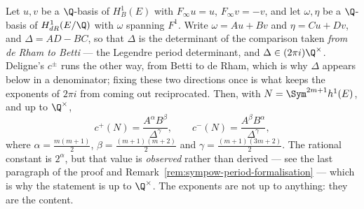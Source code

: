 \begin{proposition}
  \label{prop:sympow-period}
  Let $u,v$ be a $\Q$-basis of $H^{1}_{B}(E)$ with $F_{\infty}u = u$, $F_{\infty}v = -v$, and
  let $\omega, \eta$ be a $\Q$-basis of $H^{1}_{dR}(E/\Q)$ with $\omega$ spanning $F^{1}$.
  Write $\omega = Au + Bv$ and $\eta = Cu + Dv$, and $\Delta = AD-BC$, so that $\Delta$ is the
  determinant of the comparison taken \emph{from de Rham to Betti} --- the Legendre period
  determinant, and $\Delta \in (2\pi i)\Q^{\times}$. Deligne's $c^{\pm}$ runs the other way,
  from Betti to de Rham, which is why $\Delta$ appears below in a denominator; fixing these
  two directions once is what keeps the exponents of $2\pi i$ from coming out reciprocated.
  Then, with $N = \Sym^{2m+1}h^{1}(E)$, and up to $\Q^{\times}$,
  \[
    c^{+}(N) = \frac{A^{\alpha}B^{\beta}}{\Delta^{\gamma}},
    \qquad
    c^{-}(N) = \frac{A^{\beta}B^{\alpha}}{\Delta^{\gamma}},
  \]
  where $\alpha = \frac{m(m+1)}{2}$, $\beta = \frac{(m+1)(m+2)}{2}$ and
  $\gamma = \frac{(m+1)(3m+2)}{2}$. The rational constant is $2^{\alpha}$, but that value is
  \emph{observed} rather than derived --- see the last paragraph of the proof and
  Remark~\ref{rem:sympow-period-formalisation} --- which is why the statement is up to
  $\Q^{\times}$. The exponents are not up to anything: they are the content.
\end{proposition}
